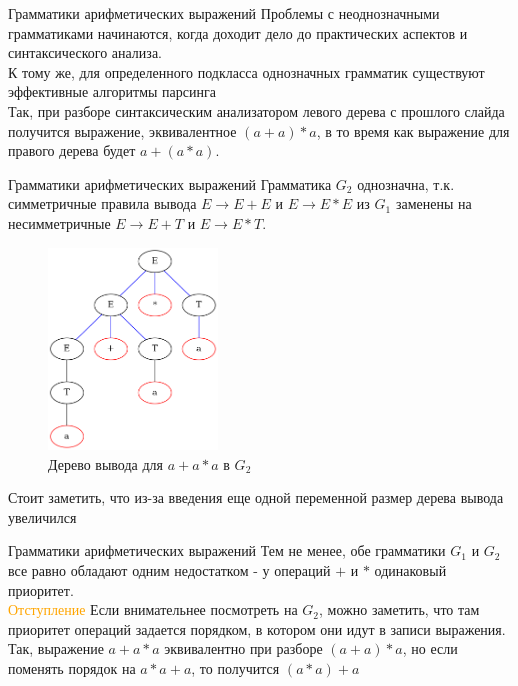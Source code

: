 \documentclass{beamer}
\begin{document}
	\begin{frame}{Грамматики арифметических выражений}
	    Проблемы с неоднозначными грамматиками начинаются, когда доходит дело до практических аспектов и синтаксического анализа.\\
	    \vspace{3mm}
	    К тому же, для определенного подкласса однозначных грамматик существуют эффективные алгоритмы парсинга\\
	    \vspace{3mm}
	    Так, при разборе синтаксическим анализатором левого дерева с прошлого слайда получится выражение, эквивалентное $(a+a)*a$, в то время как выражение для правого дерева будет $a+(a*a)$.\\
	     
	\end{frame}

    	
	\begin{frame}{Грамматики арифметических выражений}
	    Грамматика $G_2$ однозначна, т.к. симметричные правила вывода $E \to E + E$ и $E \to E * E$ из $G_1$ заменены на несимметричные $E \to E + T$ и $E \to E * T$. 
	     \begin{figure}[!tbp]
          \centering
            \includegraphics[width=0.4\textwidth]{g2_ex.png}
          \caption{Дерево вывода для $a+a*a$ в $G_2$}
        \end{figure}
        Стоит заметить, что из-за введения еще одной переменной размер дерева вывода увеличился
	\end{frame}

	\begin{frame}{Грамматики арифметических выражений}
    Тем не менее, обе грамматики $G_1$ и $G_2$ все равно обладают одним недостатком - у операций $+$ и $*$ одинаковый приоритет.\\
    \vspace{3mm}
    \textcolor{orange}{Отступление} Если внимательнее посмотреть на $G_2$, можно заметить, что там приоритет операций задается порядком, в котором они идут в записи выражения.\\
    \vspace{3mm}
    Так, выражение $a+a*a$ эквивалентно при разборе $(a+a)*a$, но если поменять порядок на $a*a+a$, то получится $(a*a)+a$
	\end{frame}
	
\end{document}
